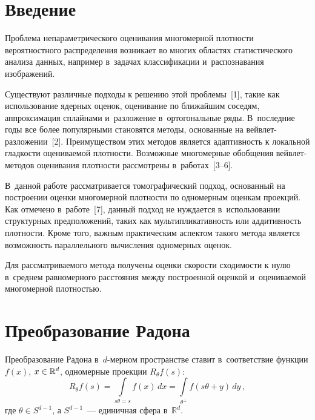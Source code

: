 \begin{multicols}{2}

\label{st\stat}

\section{Введение}

Проблема непараметрического оценивания мно\-го\-мер\-ной плотности вероятностного
распре\-деления возникает во многих областях статисти\-ческого анализа данных,
например в~задачах классификации и~распознавания изображений.

Существуют
различные подходы к решению этой проб\-ле\-мы~[1], такие как использование
ядерных оценок, оценивание по ближайшим соседям, аппроксимация сплайнами
и~разложение в~орто\-гональные ряды. В~последние годы все более популярны\-ми
становятся методы, основанные на вейв\-лет-раз\-ло\-же\-нии~[2]. Преимуществом
этих методов является адаптивность к локальной гладкости оцениваемой плотности.
Возможные многомерные обобщения вейв\-лет-ме\-то\-дов оценивания плот\-ности
рассмотрены в~работах~[3--6].

В~данной работе рассматривается томографический
подход, основанный на построении оценки многомерной плотности по одномерным
оценкам проекций. Как отмечено в~работе~[7], данный подход не нуждается
в~использовании структурных предположений, таких как мультипликативность
или аддитивность плотности. Кроме того, важным практическим аспектом такого
метода является возможность параллельного вы\-чис\-ле\-ния одномерных оценок.

Для рассматриваемого метода получены оценки скорости сходимости к нулю в~среднем
равномерного расстояния между построенной оценкой и~оцениваемой многомерной
плот\-ностью.

\section{Преобразование Радона}

Преобразование Радона в~$d$-мер\-ном пространстве ставит в~соответствие
функции $f(x)$, $x\hm\in\mathbb{R}^d$, одномерные проекции $R_\theta f(s)$:
\begin{equation*}
R_\theta f(s)=\int\limits_{s\theta=s}f(x)\,dx=
\int\limits_{\theta^\perp}f(s\theta+y)\,dy\,,
\end{equation*}
где $\theta\in S^{d-1}$, а $S^{d-1}$~--- единичная сфера в~$\mathbb{R}^d$.


\end{multicols}
